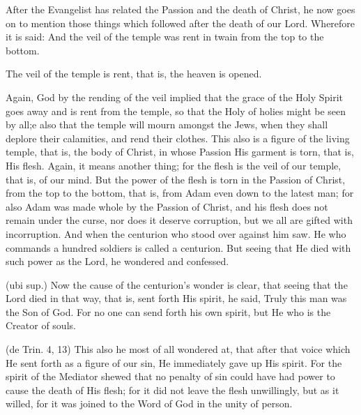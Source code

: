  

 After the Evangelist has related the Passion and the death of Christ, he now goes on to mention those things which followed after the death of our Lord. Wherefore it is said: And the veil of the temple was rent in twain from the top to the bottom.

 The veil of the temple is rent, that is, the heaven is opened.

 Again, God by the rending of the veil implied that the grace of the Holy Spirit goes away and is rent from the temple, so that the Holy of holies might be seen by all;e also that the temple will mourn amongst the Jews, when they shall deplore their calamities, and rend their clothes. This also is a figure of the living temple, that is, the body of Christ, in whose Passion His garment is torn, that is, His flesh. Again, it means another thing; for the flesh is the veil of our temple, that is, of our mind. But the power of the flesh is torn in the Passion of Christ, from the top to the bottom, that is, from Adam even down to the latest man; for also Adam was made whole by the Passion of Christ, and his flesh does not remain under the curse, nor does it deserve corruption, but we all are gifted with incorruption. And when the centurion who stood over against him saw. He who commands a hundred soldiers is called a centurion. But seeing that He died with such power as the Lord, he wondered and confessed.

 (ubi sup.) Now the cause of the centurion’s wonder is clear, that seeing that the Lord died in that way, that is, sent forth His spirit, he said, Truly this man was the Son of God. For no one can send forth his own spirit, but He who is the Creator of souls.

 (de Trin. 4, 13) This also he most of all wondered at, that after that voice which He sent forth as a figure of our sin, He immediately gave up His spirit. For the spirit of the Mediator shewed that no penalty of sin could have had power to cause the death of His flesh; for it did not leave the flesh unwillingly, but as it willed, for it was joined to the Word of God in the unity of person.

